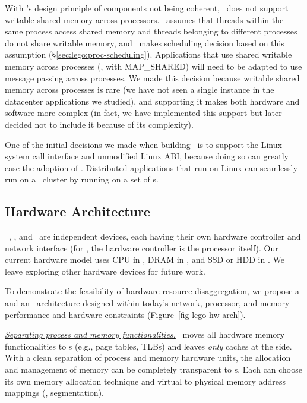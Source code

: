 With \splitkernel's design principle of components not being coherent,
\lego\ does not support writable shared memory across processors. %
\lego\ assumes that threads within the same process access shared memory
and threads belonging to different processes do not share writable memory,
and \lego\ makes scheduling decision based on this assumption (\S\ref{sec:lego:proc-scheduling}).
Applications that use shared writable memory across processes (\eg, with MAP\_SHARED)
will need to be adapted to use message passing across processes.
We made this decision because writable shared memory across processes is rare 
(we have not seen a single instance in the datacenter applications we studied),
and supporting it makes both hardware and software more complex 
(in fact, we have implemented this support but later decided not to include it because of its complexity).

One of the initial decisions we made when building \lego\ is to support the Linux system call interface 
and unmodified Linux ABI,
because doing so can greatly ease the adoption of \lego.
Distributed applications that run on Linux can seamlessly run on a \lego\ cluster
by running on a set of \vnode{}s. %

\subsection{Hardware Architecture}
\label{sec:lego:hardware}

\lego\ \pcomponent, \mcomponent, and \scomponent\ are independent devices,
each having their own hardware controller and network interface (for \pcomponent, the hardware controller is the processor itself).
Our current hardware model uses CPU in \pcomponent, 
DRAM in \mcomponent, and SSD or HDD in \scomponent.
We leave exploring other hardware devices for future work.

To demonstrate the feasibility of hardware resource disaggregation,
we propose a \pcomponent{} and an \mcomponent\ architecture designed 
within today's network, processor, and memory performance and hardware constraints
(Figure~\ref{fig-lego-hw-arch}).

\textit{\uline{Separating process and memory functionalities.}}
\lego\ moves all hardware memory functionalities to \mcomponent{}s 
(e.g., page tables, TLBs) and leaves {\em only} caches at the \pcomponent{} side. 
With a clean separation of process and memory hardware units, 
the allocation and management of memory can be completely transparent to \pcomponent{}s.
Each \mcomponent{} can choose its own memory allocation technique
and virtual to physical memory address mappings (\eg, segmentation). 

